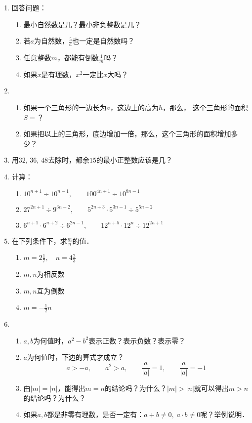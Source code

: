 \begin{enumerate}
    \item 回答问题：
\begin{enumerate}
    \item 最小自然数是几？最小非负整数是几？
    \item 若$a$为自然数，$\frac{5}{a}$也一定是自然数吗？
    \item 任意整数$m$，都能有倒数$\frac{1}{m}$吗？
    \item 如果$x$是有理数，$x^2$一定比$x$大吗？
\end{enumerate}
   
\item \begin{enumerate}
    \item 如果一个三角形的一边长为$a$，这边上的高为$h$，那么，
这个三角形的面积$S=$？
\item 如果把以上的三角形，底边增加一倍，那么，这个三角形的面积增加多少？
\end{enumerate}

\item 用$32$, $36$, $48$去除时，都余$15$的最小正整数应该是几？

\item 计算：
\begin{enumerate}
    \item $10^{n+1}\div 10^{n-1}  ,\qquad 100^{4n+1}\div 10^{8n-1} $
    \item $27^{2n+1}\div 9^{3n-2}  ,\qquad 5^{2n+3}\cdot 5^{3n-1}\div 5^{5n+2} $
    \item $6^{n+1}\cdot 6^{n+2} \div 6^{2n-1},\qquad 12^{n+5}\cdot 12^n\div 12^{2n+1} $
\end{enumerate}

\item 在下列条件下，求$\frac{m}{n}$的值．
\begin{multicols}{2}
    \begin{enumerate}
        \item $m=2\frac{1}{7},\quad n=4\frac{2}{3}$
        \item $m,n$为相反数
        \item $m,n$互为倒数
        \item $m=-\frac{1}{2}n$
    \end{enumerate}
\end{multicols}

\item  \begin{enumerate}
    \item $a,b$为何值时，$a^2-b^2$表示正数？表示负数？表示零？
    \item $a$为何值时，下边的算式才成立？
    \[a>-a,\qquad a^2>a,\qquad \frac{a}{|a|}=1,\qquad \frac{a}{|a|}=-1\]
    \item 由$|m|=|n|$，能得出$m=n$的结论吗？为什么？$|m|>|n|$就可以得出$m>n$的结论吗？为什么？
    \item 如果$a,b$都是非零有理数，是否一定有：$a+b\ne 0,\; a\cdot b\ne 0$呢？举例说明．
\end{enumerate}


\end{enumerate}
